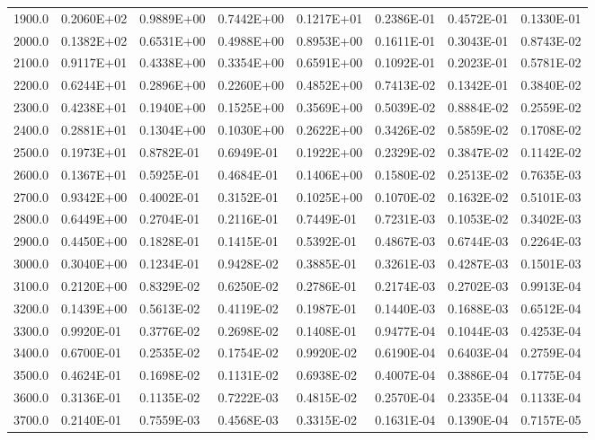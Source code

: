 \begin{table}[tbh]
\begin{center}
{\begin{tabular}{|r|l|l|l|l|l|l|l|}
  1900.0 & 0.2060E+02 & 0.9889E+00 & 0.7442E+00 & 0.1217E+01 & 0.2386E-01 & 0.4572E-01 & 0.1330E-01 \\
  2000.0 & 0.1382E+02 & 0.6531E+00 & 0.4988E+00 & 0.8953E+00 & 0.1611E-01 & 0.3043E-01 & 0.8743E-02 \\
  2100.0 & 0.9117E+01 & 0.4338E+00 & 0.3354E+00 & 0.6591E+00 & 0.1092E-01 & 0.2023E-01 & 0.5781E-02 \\
  2200.0 & 0.6244E+01 & 0.2896E+00 & 0.2260E+00 & 0.4852E+00 & 0.7413E-02 & 0.1342E-01 & 0.3840E-02 \\
  2300.0 & 0.4238E+01 & 0.1940E+00 & 0.1525E+00 & 0.3569E+00 & 0.5039E-02 & 0.8884E-02 & 0.2559E-02 \\
  2400.0 & 0.2881E+01 & 0.1304E+00 & 0.1030E+00 & 0.2622E+00 & 0.3426E-02 & 0.5859E-02 & 0.1708E-02 \\
  2500.0 & 0.1973E+01 & 0.8782E-01 & 0.6949E-01 & 0.1922E+00 & 0.2329E-02 & 0.3847E-02 & 0.1142E-02 \\
  2600.0 & 0.1367E+01 & 0.5925E-01 & 0.4684E-01 & 0.1406E+00 & 0.1580E-02 & 0.2513E-02 & 0.7635E-03 \\
  2700.0 & 0.9342E+00 & 0.4002E-01 & 0.3152E-01 & 0.1025E+00 & 0.1070E-02 & 0.1632E-02 & 0.5101E-03 \\
  2800.0 & 0.6449E+00 & 0.2704E-01 & 0.2116E-01 & 0.7449E-01 & 0.7231E-03 & 0.1053E-02 & 0.3402E-03 \\
  2900.0 & 0.4450E+00 & 0.1828E-01 & 0.1415E-01 & 0.5392E-01 & 0.4867E-03 & 0.6744E-03 & 0.2264E-03 \\
  3000.0 & 0.3040E+00 & 0.1234E-01 & 0.9428E-02 & 0.3885E-01 & 0.3261E-03 & 0.4287E-03 & 0.1501E-03 \\
  3100.0 & 0.2120E+00 & 0.8329E-02 & 0.6250E-02 & 0.2786E-01 & 0.2174E-03 & 0.2702E-03 & 0.9913E-04 \\
  3200.0 & 0.1439E+00 & 0.5613E-02 & 0.4119E-02 & 0.1987E-01 & 0.1440E-03 & 0.1688E-03 & 0.6512E-04 \\
  3300.0 & 0.9920E-01 & 0.3776E-02 & 0.2698E-02 & 0.1408E-01 & 0.9477E-04 & 0.1044E-03 & 0.4253E-04 \\
  3400.0 & 0.6700E-01 & 0.2535E-02 & 0.1754E-02 & 0.9920E-02 & 0.6190E-04 & 0.6403E-04 & 0.2759E-04 \\
  3500.0 & 0.4624E-01 & 0.1698E-02 & 0.1131E-02 & 0.6938E-02 & 0.4007E-04 & 0.3886E-04 & 0.1775E-04 \\
  3600.0 & 0.3136E-01 & 0.1135E-02 & 0.7222E-03 & 0.4815E-02 & 0.2570E-04 & 0.2335E-04 & 0.1133E-04 \\
  3700.0 & 0.2140E-01 & 0.7559E-03 & 0.4568E-03 & 0.3315E-02 & 0.1631E-04 & 0.1390E-04 & 0.7157E-05 \\

\end{tabular}}
\end{center}
\end{table}
